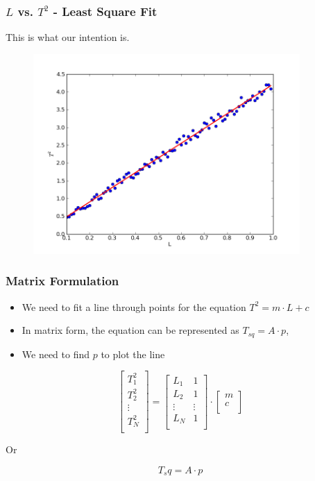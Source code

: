 \documentclass[14pt,compress]{beamer}
\begin{document}
\begin{frame}[fragile]
\frametitle{$L$ vs. $T^2$ - Least Square Fit}
This is what our intention is.
\vspace{-0.1in}
\begin{figure}
\includegraphics[width=4in]{data/least-sq-fit}
\end{figure}
\end{frame}

\begin{frame}[fragile]
\frametitle{Matrix Formulation}
\begin{itemize}
\item We need to fit a line through points for the equation $T^2 = m \cdot L+c$
\item In matrix form, the equation can be represented as $T_{sq} = A \cdot p$,
\item We need to find $p$ to plot the line
\end{itemize}
\end{frame}

\begin{frame}
  \begin{equation}
  \begin{bmatrix}
  T^2_1 \\
  T^2_2 \\
  \vdots\\
  T^2_N \\
\end{bmatrix}
= \begin{bmatrix}
  L_1 & 1 \\
  L_2 & 1 \\
  \vdots & \vdots\\
  L_N & 1 \\
\end{bmatrix} \cdot
\begin{bmatrix}
  m\\
  c\\
  \end{bmatrix}
\end{equation}

Or

\[T_sq = A \cdot p \]

\end{frame}
\end{document}
